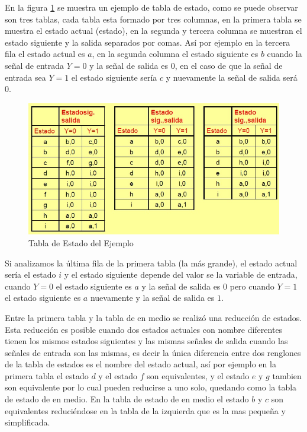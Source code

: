 \documentclass[12pt]{book}
\theoremstyle{definition}
\theoremstyle{remark}
\theoremstyle{plain}
\begin{document}
En la figura \ref{fig39} se muestra un ejemplo de tabla de estado, como se puede observar son tres tablas, cada tabla esta formado por tres columnas, en la primera tabla se muestra el estado actual (estado), en la segunda y tercera columna se muestran el estado siguiente y la salida separados por comas. Así por ejemplo en la tercera fila el estado actual es $a$, en la segunda columna el estado siguiente es $b$ cuando la señal de entrada $Y=0$ y la señal de salida es $0$, en el caso de que la señal de entrada sea $Y=1$ el estado siguiente sería $c$ y nuevamente la señal de salida será $0$.

\begin{figure}
\centering
\includegraphics[width=5in]{TablaEstado.jpg}
\caption{Tabla de Estado del Ejemplo}
\label{fig39}
\end{figure}

Si analizamos la última fila de la primera tabla (la más grande), el estado actual sería el estado $i$ y el estado siguiente depende del valor se la variable de entrada, cuando $Y=0$ el estado siguiente es $a$ y la señal de salida es $0$ pero cuando $Y=1$ el estado siguiente es $a$ nuevamente y la señal de salida es $1$.

Entre la primera tabla y la tabla de en medio se realizó una reducción de estados. Esta reducción es posible cuando dos estados actuales con nombre diferentes tienen los mismos estados siguientes y las mismas señales de salida cuando las señales de entrada son las mismas, es decir la única diferencia entre dos renglones de la tabla de estados es el nombre del estado actual, así por ejemplo en la primera tabla el estado $d$ y el estado $f$ son equivalentes, y el estado $e$ y $g$ tambien son equivalente por lo cual pueden reducirse a uno solo, quedando como la tabla de estado de en medio. En la tabla de estado de en medio el estado $b$ y $c$ son equivalentes reduciéndose en la tabla de la izquierda que es la mas pequeña y simplificada.
\end{document}
